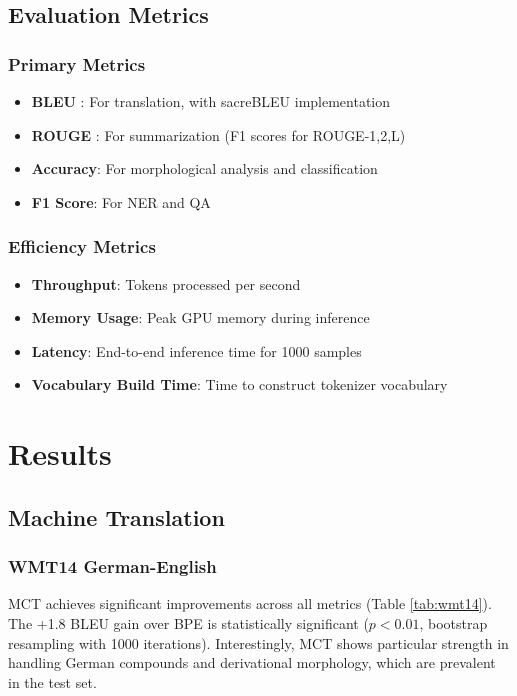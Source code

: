 \documentclass[conference]{IEEEtran}
\begin{document}
\subsection{Evaluation Metrics}

\subsubsection{Primary Metrics}
\begin{itemize}
    \item \textbf{BLEU} \cite{papineni2002bleu}: For translation, with sacreBLEU implementation
    \item \textbf{ROUGE} \cite{lin2004rouge}: For summarization (F1 scores for ROUGE-1,2,L)
    \item \textbf{Accuracy}: For morphological analysis and classification
    \item \textbf{F1 Score}: For NER and QA
\end{itemize}

\subsubsection{Efficiency Metrics}
\begin{itemize}
    \item \textbf{Throughput}: Tokens processed per second
    \item \textbf{Memory Usage}: Peak GPU memory during inference
    \item \textbf{Latency}: End-to-end inference time for 1000 samples
    \item \textbf{Vocabulary Build Time}: Time to construct tokenizer vocabulary
\end{itemize}

\section{Results}
\label{sec:results}

\subsection{Machine Translation}

\subsubsection{WMT14 German-English}
MCT achieves significant improvements across all metrics (Table \ref{tab:wmt14}). The +1.8 BLEU gain over BPE is statistically significant ($p < 0.01$, bootstrap resampling with 1000 iterations). Interestingly, MCT shows particular strength in handling German compounds and derivational morphology, which are prevalent in the test set.
\end{document}
